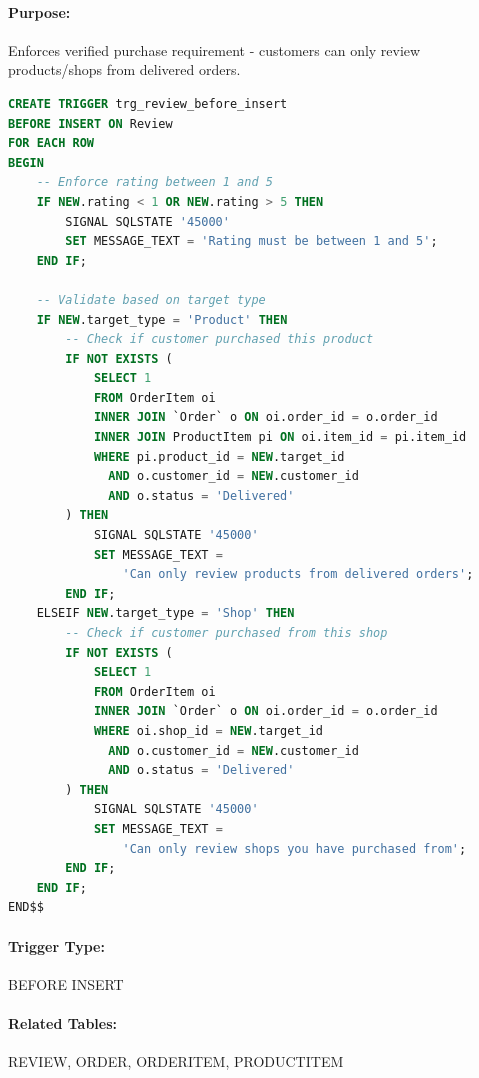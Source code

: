 \paragraph{Purpose:} Enforces verified purchase requirement - customers can only review products/shops from delivered orders.

\begin{lstlisting}[language=SQL, caption=Trigger: trg\_review\_before\_insert, label=lst:trg_review_before]
CREATE TRIGGER trg_review_before_insert
BEFORE INSERT ON Review
FOR EACH ROW
BEGIN
    -- Enforce rating between 1 and 5
    IF NEW.rating < 1 OR NEW.rating > 5 THEN
        SIGNAL SQLSTATE '45000' 
        SET MESSAGE_TEXT = 'Rating must be between 1 and 5';
    END IF;
    
    -- Validate based on target type
    IF NEW.target_type = 'Product' THEN
        -- Check if customer purchased this product
        IF NOT EXISTS (
            SELECT 1
            FROM OrderItem oi
            INNER JOIN `Order` o ON oi.order_id = o.order_id
            INNER JOIN ProductItem pi ON oi.item_id = pi.item_id
            WHERE pi.product_id = NEW.target_id
              AND o.customer_id = NEW.customer_id
              AND o.status = 'Delivered'
        ) THEN
            SIGNAL SQLSTATE '45000' 
            SET MESSAGE_TEXT = 
                'Can only review products from delivered orders';
        END IF;
    ELSEIF NEW.target_type = 'Shop' THEN
        -- Check if customer purchased from this shop
        IF NOT EXISTS (
            SELECT 1
            FROM OrderItem oi
            INNER JOIN `Order` o ON oi.order_id = o.order_id
            WHERE oi.shop_id = NEW.target_id
              AND o.customer_id = NEW.customer_id
              AND o.status = 'Delivered'
        ) THEN
            SIGNAL SQLSTATE '45000' 
            SET MESSAGE_TEXT = 
                'Can only review shops you have purchased from';
        END IF;
    END IF;
END$$
\end{lstlisting}

\paragraph{Trigger Type:} BEFORE INSERT

\paragraph{Related Tables:} REVIEW, ORDER, ORDERITEM, PRODUCTITEM

